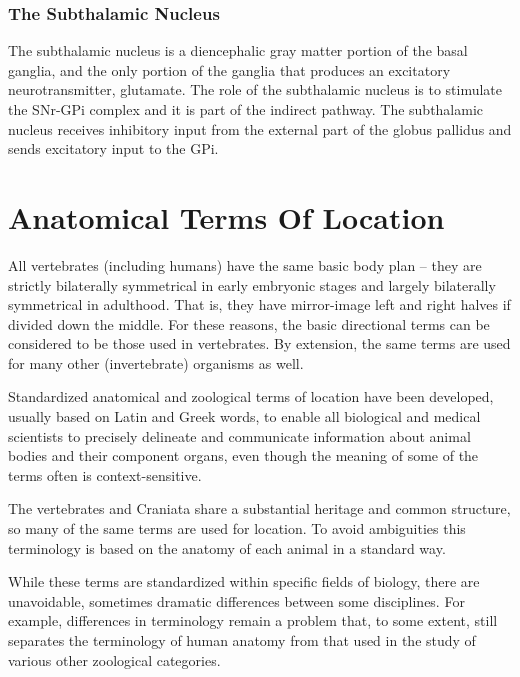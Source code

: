 \documentclass[]{book}
\begin{document}
\hypertarget{the-subthalamic-nucleus}{%
\subsection{The Subthalamic Nucleus}\label{the-subthalamic-nucleus}}

The subthalamic nucleus is a diencephalic gray matter portion of the basal ganglia, and the only portion of the ganglia that produces an excitatory neurotransmitter, glutamate. The role of the subthalamic nucleus is to stimulate the SNr-GPi complex and it is part of the indirect pathway. The subthalamic nucleus receives inhibitory input from the external part of the globus pallidus and sends excitatory input to the GPi.

\hypertarget{appendix-appendix}{%
\appendix}


\hypertarget{anatomical-terms-of-location}{%
\chapter{Anatomical Terms Of Location}\label{anatomical-terms-of-location}}

All vertebrates (including humans) have the same basic body plan -- they are strictly bilaterally symmetrical in early embryonic stages and largely bilaterally symmetrical in adulthood. That is, they have mirror-image left and right halves if divided down the middle. For these reasons, the basic directional terms can be considered to be those used in vertebrates. By extension, the same terms are used for many other (invertebrate) organisms as well.

Standardized anatomical and zoological terms of location have been developed, usually based on Latin and Greek words, to enable all biological and medical scientists to precisely delineate and communicate information about animal bodies and their component organs, even though the meaning of some of the terms often is context-sensitive.

The vertebrates and Craniata share a substantial heritage and common structure, so many of the same terms are used for location. To avoid ambiguities this terminology is based on the anatomy of each animal in a standard way.

While these terms are standardized within specific fields of biology, there are unavoidable, sometimes dramatic differences between some disciplines. For example, differences in terminology remain a problem that, to some extent, still separates the terminology of human anatomy from that used in the study of various other zoological categories.
\end{document}
